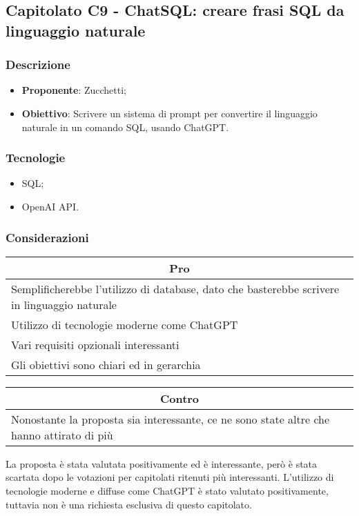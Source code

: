 \subsection{Capitolato C9 - ChatSQL: creare frasi SQL da linguaggio naturale}


\subsubsection{Descrizione}
\begin{itemize}
    \item \textbf{Proponente}: Zucchetti;
    \item \textbf{Obiettivo}: Scrivere un sistema di prompt per convertire il linguaggio naturale in un comando SQL, usando ChatGPT.
\end{itemize}


\subsubsection{Tecnologie}
\begin{itemize}
    \item SQL;
    \item OpenAI API.
\end{itemize}


\subsubsection{Considerazioni}
\begin{minipage}[t]{0.45\linewidth}
    \vspace{0pt}
    {\renewcommand{\arraystretch}{1.5}
    \begin{tabular}{p{1\linewidth}}
        \multicolumn{1}{c}{\textbf{Pro}} \\
        \midrule
        Semplificherebbe l'utilizzo di database, dato che basterebbe scrivere in linguaggio naturale \\
        Utilizzo di tecnologie moderne come ChatGPT \\
        Vari requisiti opzionali interessanti \\
        Gli obiettivi sono chiari ed in gerarchia \\
        \hline
    \end{tabular}
    }
\end{minipage}
\hspace{0.05\linewidth}
\begin{minipage}[t]{0.45\linewidth}
    \vspace{0pt}
    {\renewcommand{\arraystretch}{1.5}
    \begin{tabular}{p{1\linewidth}}
        \multicolumn{1}{c}{\textbf{Contro}} \\
        \midrule
        Nonostante la proposta sia interessante, ce ne sono state altre che hanno attirato di più \\
        \hline
    \end{tabular}
    }
\end{minipage}
\vspace{1em}

La proposta è stata valutata positivamente ed è interessante, però è stata scartata dopo le votazioni per capitolati ritenuti più interessanti.
L'utilizzo di tecnologie moderne e diffuse come ChatGPT è stato valutato positivamente, tuttavia non è una richiesta esclusiva di questo capitolato.